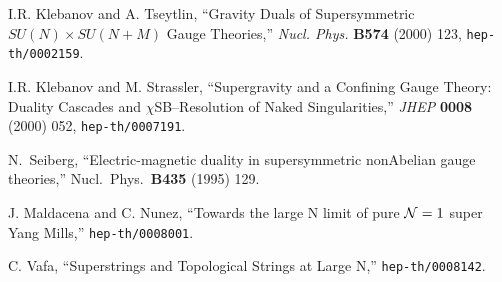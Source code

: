 \begin{thebibliography}{99}
I.R. Klebanov and A. Tseytlin,
``Gravity Duals of Supersymmetric $SU(N)\times SU(N+M)$ Gauge Theories,''
{\em Nucl. Phys.} {\bf B574} (2000) 123,
{\tt hep-th/0002159}.

I.R. Klebanov and M. Strassler,
``Supergravity and a Confining Gauge Theory: Duality Cascades and
$\chi$SB--Resolution of Naked Singularities,''
{\em JHEP} {\bf 0008} (2000) 052, {\tt hep-th/0007191}.

N.~Seiberg,
``Electric-magnetic duality in supersymmetric nonAbelian gauge theories,''
Nucl.\ Phys.\  {\bf B435} (1995) 129.

J. Maldacena and C. Nunez,
``Towards the large N limit of pure ${\cal N}=1$ super Yang Mills,''
{\tt hep-th/0008001}.

C. Vafa,
``Superstrings and Topological Strings at Large N,''
{\tt hep-th/0008142}.

\end{thebibliography}










